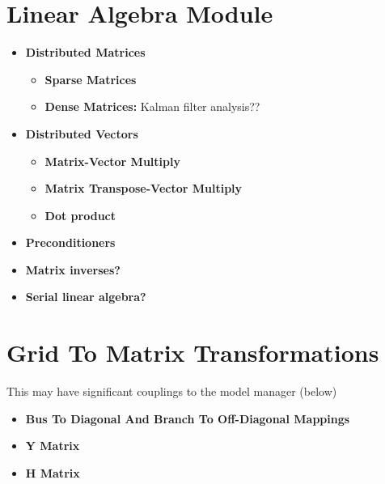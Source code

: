 \documentclass[12pt]{article}
\begin{document}
\section{Linear Algebra Module}
\begin{itemize}
\item{\bf Distributed Matrices}
\begin{itemize}
\item{\bf Sparse Matrices}
\item{\bf Dense Matrices:} Kalman filter analysis??
\end{itemize}
\item{\bf Distributed Vectors}
\begin{itemize}
\item{\bf Matrix-Vector Multiply}
\item{\bf Matrix Transpose-Vector Multiply}
\item{\bf Dot product}
\end{itemize}
\item{\bf Preconditioners}
\item{\bf Matrix inverses?}
\item{\bf Serial linear algebra?}
\end{itemize}

\section{Grid To Matrix Transformations}
This may have significant couplings to the model manager (below)
\begin{itemize}
\item{\bf Bus To Diagonal And Branch To Off-Diagonal Mappings}
\item{\bf Y Matrix}
\item{\bf H Matrix}
\end{itemize}
\end{document}
